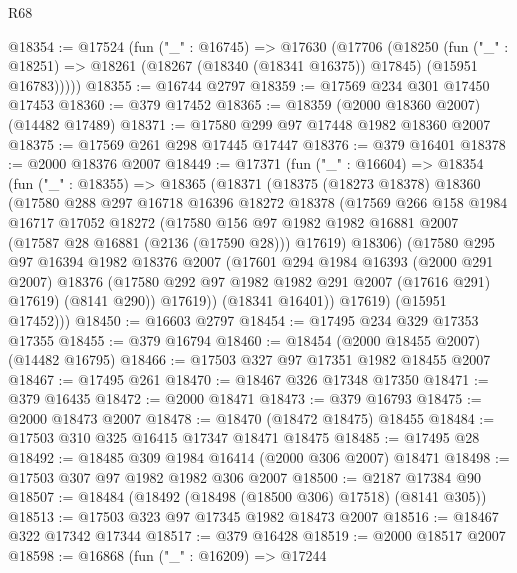 \begin{lexlean}{R68}
\begin{coremodule}
@18354 := @17524
    (fun ("_" : @16745) =>
    @17630
      (@17706
        (@18250
          (fun ("_" : @18251) => @18261 (@18267 (@18340 (@18341 @16375)) @17845) (@15951 @16783)))))
@18355 := @16744 @2797
@18359 := @17569 @234 @301 @17450 @17453
@18360 := @379 @17452
@18365 := @18359 (@2000 @18360 @2007) (@14482 @17489)
@18371 := @17580 @299 @97 @17448 @1982 @18360 @2007
@18375 := @17569 @261 @298 @17445 @17447
@18376 := @379 @16401
@18378 := @2000 @18376 @2007
@18449 := @17371
    (fun ("_" : @16604) =>
    @18354
      (fun ("_" : @18355) =>
      @18365
        (@18371
          (@18375
            (@18273 @18378)
            @18360
            (@17580
              @288
              @297
              @16718
              @16396
              @18272
              @18378
              (@17569
                @266
                @158
                @1984
                @16717
                @17052
                @18272
                (@17580
                  @156
                  @97
                  @1982
                  @1982
                  @16881
                  @2007
                  (@17587 @28 @16881 (@2136 (@17590 @28)))
                  @17619)
                @18306)
              (@17580
                @295
                @97
                @16394
                @1982
                @18376
                @2007
                (@17601
                  @294
                  @1984
                  @16393
                  (@2000 @291 @2007)
                  @18376
                  (@17580 @292 @97 @1982 @1982 @291 @2007 (@17616 @291) @17619)
                  (@8141 @290))
                @17619))
            (@18341 @16401))
          @17619)
        (@15951 @17452)))
@18450 := @16603 @2797
@18454 := @17495 @234 @329 @17353 @17355
@18455 := @379 @16794
@18460 := @18454 (@2000 @18455 @2007) (@14482 @16795)
@18466 := @17503 @327 @97 @17351 @1982 @18455 @2007
@18467 := @17495 @261
@18470 := @18467 @326 @17348 @17350
@18471 := @379 @16435
@18472 := @2000 @18471
@18473 := @379 @16793
@18475 := @2000 @18473 @2007
@18478 := @18470 (@18472 @18475) @18455
@18484 := @17503 @310 @325 @16415 @17347 @18471 @18475
@18485 := @17495 @28
@18492 := @18485 @309 @1984 @16414 (@2000 @306 @2007) @18471
@18498 := @17503 @307 @97 @1982 @1982 @306 @2007
@18500 := @2187 @17384 @90
@18507 := @18484 (@18492 (@18498 (@18500 @306) @17518) (@8141 @305))
@18513 := @17503 @323 @97 @17345 @1982 @18473 @2007
@18516 := @18467 @322 @17342 @17344
@18517 := @379 @16428
@18519 := @2000 @18517 @2007
@18598 := @16868
    (fun ("_" : @16209) =>
    @17244

\end{coremodule}
\end{lexlean}
